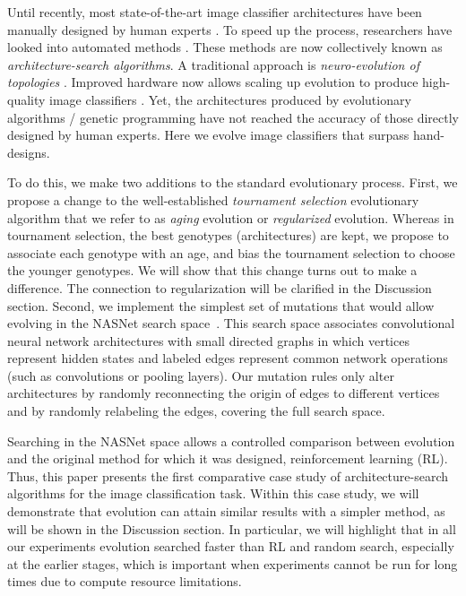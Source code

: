 \documentclass[letterpaper]{article} \usepackage{aaai19}  \usepackage{times}  \usepackage{helvet}  \usepackage{courier}  \usepackage{graphicx}  \frenchspacing
\begin{document}
Until recently, most state-of-the-art image classifier architectures have been manually designed by human experts \cite{krizhevsky2012imagenet,szegedy2015going,he2016deep,huang2016densely,hu2017squeeze}. To speed up the process, researchers have looked into automated methods \cite{baker2016designing,zoph2016neural,miikkulainen2017evolving,real2017large,xie2017genetic,suganuma2017genetic,liu2017progressive,pham2018faster}. These methods are now collectively known as \textit{architecture-search algorithms}. A traditional approach is \textit{neuro-evolution of topologies} \cite{miller1989designing,angeline1994evolutionary,stanley2002evolving}. Improved hardware now allows scaling up evolution to produce high-quality image classifiers \cite{real2017large,xie2017genetic,liu2017hierarchical}. Yet, the architectures produced by evolutionary algorithms / genetic programming have not reached the accuracy of those directly designed by human experts. Here we evolve image classifiers that surpass hand-designs.

To do this, we make two additions to the standard evolutionary process. First, we propose a change to the well-established \textit{tournament selection} evolutionary algorithm \cite{goldberg1991comparative} that we refer to as \textit{aging} evolution or \textit{regularized} evolution. Whereas in tournament selection, the best genotypes (architectures) are kept, we propose to associate each genotype with an age, and bias the tournament selection to choose the younger genotypes. We will show that this change turns out to make a difference. The connection to regularization will be clarified in the Discussion section. Second, we implement the simplest set of mutations that would allow evolving in the NASNet search space~\cite{zoph2017learning}. This search space associates convolutional neural network architectures with small directed graphs in which vertices represent hidden states and labeled edges represent common network operations (such as convolutions or pooling layers). Our mutation rules only alter architectures by randomly reconnecting the origin of edges to different vertices and by randomly relabeling the edges, covering the full search space.

Searching in the NASNet space allows a controlled comparison between evolution and the original method for which it was designed, reinforcement learning (RL). Thus, this paper presents the first comparative case study of architecture-search algorithms for the image classification task. Within this case study, we will demonstrate that evolution can attain similar results with a simpler method, as will be shown in the Discussion section. In particular, we will highlight that in all our experiments evolution searched faster than RL and random search, especially at the earlier stages, which is important when experiments cannot be run for long times due to compute resource limitations.
\end{document}
